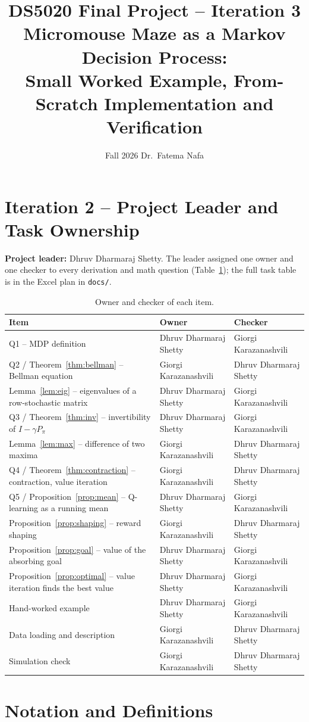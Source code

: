 \documentclass[10pt]{article}
\title{DS5020 Final Project -- Iteration 3\\[4pt]
\large Micromouse Maze as a Markov Decision Process:\\
Small Worked Example, From-Scratch Implementation and Verification}
\author{\GK \and \DS}
\date{Fall 2026 \quad Dr.\ Fatema Nafa}
\theoremstyle{definition}
\newcommand{\GK}{Giorgi Karazanashvili}
\newcommand{\DS}{Dhruv Dharmaraj Shetty}
\begin{document}
\maketitle

\section{Iteration 2 -- Project Leader and Task Ownership}

\noindent\textbf{Project leader:} \DS. The leader assigned one owner and one checker to every derivation and math question (Table~\ref{tab:owners}); the full task table is in the Excel plan in \texttt{docs/}.

\begin{table}[h]
\centering
\small
\begin{tabular}{lll}
\toprule
Item & Owner & Checker\\
\midrule
Q1 -- MDP definition & \DS & \GK\\
Q2 / Theorem~\ref{thm:bellman} -- Bellman equation & \GK & \DS\\
Lemma~\ref{lem:eig} -- eigenvalues of a row-stochastic matrix & \DS & \GK\\
Q3 / Theorem~\ref{thm:inv} -- invertibility of $I-\gamma P_\pi$ & \DS & \GK\\
Lemma~\ref{lem:max} -- difference of two maxima & \GK & \DS\\
Q4 / Theorem~\ref{thm:contraction} -- contraction, value iteration & \GK & \DS\\
Q5 / Proposition~\ref{prop:mean} -- Q-learning as a running mean & \DS & \GK\\
Proposition~\ref{prop:shaping} -- reward shaping & \GK & \DS\\
Proposition~\ref{prop:goal} -- value of the absorbing goal & \DS & \GK\\
Proposition~\ref{prop:optimal} -- value iteration finds the best value & \DS & \GK\\
Hand-worked example & \DS & \GK\\
Data loading and description & \GK & \DS\\
Simulation check & \GK & \DS\\
\bottomrule
\end{tabular}
\caption{Owner and checker of each item.}
\label{tab:owners}
\end{table}

\clearpage
\section{Notation and Definitions}
\end{document}
